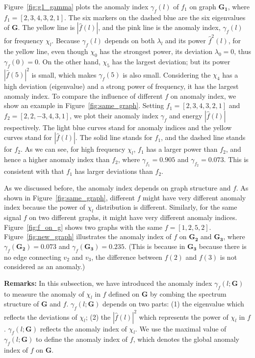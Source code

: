 Figure~\ref{fig:g1_gamma} plots the anomaly index $\gamma_f(l)$ of $f_1$ on graph $\mathbf{G_1}$, where $f_1=[2,3,4,3,2,1]$. The six markers on the dashed blue are the six eigenvalues of $\mathbf{G}$. The yellow line is $|\hat{f}(l)|$, and the pink line is the anomaly index, $\gamma_f(l)$ for frequency $\chi_l$. Because $\gamma_f(l)$ depends on both $\lambda_l$ and its power $\hat{f}^2(l)$, for the yellow line, even though $\chi_0$ has the strongest power, its deviation $\lambda_0 = 0$, thus $\gamma_f(0)=0$. On the other hand, $\chi_5$ has the largest deviation; but its power $|\hat{f}(5)|^2$ is small, which makes $\gamma_f(5)$ is also small. Considering the $\chi_4$ has a high deviation (eigenvalue) and a strong power of frequency, it has the largest anomaly index. To compare the influence of different $f$ on anomaly index, we show an example in Figure~\ref{fig:same_graph}. Setting $f_1=[2,3,4,3,2,1]$ and $f_2=[2,2,-3,4,3,1]$, we plot their anomaly index $\gamma_{f}$ and energy $|\hat{f}(l)|$ respectively.
The light blue curves stand for anomaly indices and the
yellow curves stand for $|\hat{f}(l)|$. The solid line stands for $f_1$, and the
dashed line stands for $f_2$. As we can see, for high frequency $\chi_l$, $f_1$ has a larger power than $f_2$, and hence a higher anomaly index than $f_2$, where $\gamma_{f_1}=0.905$ and $\gamma_{f_2}=0.073$. This is consistent with that $f_1$ has larger deviations than $f_2$.

As we discussed before, the anomaly index depends on graph structure and $f$. As shown in Figure~\ref{fig:same_graph}, different $f$ might have very different anomaly index because the power of $\chi_l$ distribution is different. Similarly, for the same signal $f$ on two different graphs, it might have very different anomaly indices. Figure~\ref{fig:f_on_g} shows two graphs with the same $f=[1,2,5,2]$. Figure~\ref{fig:new_graph} illustrates the anomaly index of $f$ on $\mathbf{G_2}$ and $\mathbf{G_3}$, where $\gamma_{f}(\mathbf{G_2})=0.073$ and $\gamma_{f}(\mathbf{G_3})=0.235$. (This is because in $\mathbf{G_3}$ because there is no edge connecting $v_2$ and $v_3$, the difference between $f(2)$ and $f(3)$ is not considered as an anomaly.)


{\textbf{Remarks:}}
In this subsection, we have introduced the anomaly index $\gamma_f(l;\mathbf{G})$ to measure the anomaly of $\chi_l$ in $f$ defined on $\mathbf{G}$ by combing the spectrum structure of $\mathbf{G}$ and $f$. $\gamma_f(l;\mathbf{G})$ depends on two parts: (1) the eigenvalue which reflects the deviations of $\chi_l$; (2) the $|\hat{f}(l)|^2$  which represents the power of $\chi_l$ in $f$. $\gamma_f(l;\mathbf{G})$ reflects the anomaly index of $\chi_l$. We use the maximal value of $\gamma_f(l;\mathbf{G})$ to define the anomaly index of $f$, which denotes the global anomaly index of $f$ on $\mathbf{G}$.



